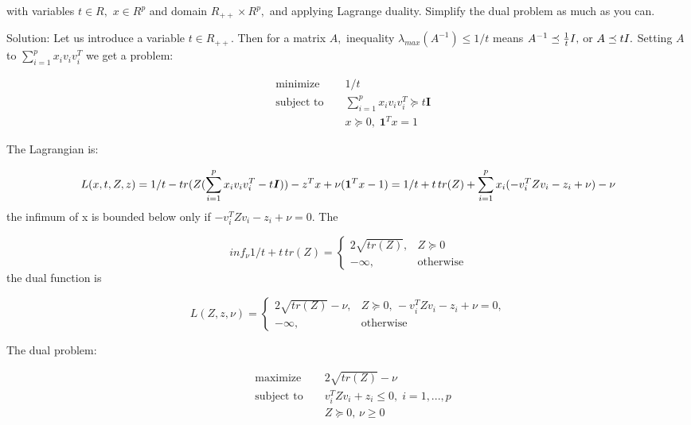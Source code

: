 \documentclass{article}
\begin{document}
with variables $t \in R,$ $x \in R^p$ and domain 
$R_{++} \times R^p,$ and applying Lagrange duality. Simplify the dual problem as much as you can.

Solution:
Let us introduce a variable $t  \in R_{++}.$ Then for a matrix $A,$ inequality 
$\lambda_{max}(A^{-1})  \leq 1 / t$ means $A^{-1} \preceq \frac{1}{t}\boldmath{I},$ or 
$A \preceq t \boldmath{I}.$ Setting $A$ to 
$\sum_{i = 1}^p x_i v_i v_i^T$ we get a problem:

\begin{align*}
&\text{minimize } && 1 / t \\
&\text{subject to } 
&& \sum_{i = 1}^p x_i v_i v_i^T
\succeq t \boldsymbol{I} \\
& &&x \succeq 0, \; \boldsymbol{1}^T x = 1
\end{align*} 





The Lagrangian is: 

$$
L(x, t, Z, z) = 1 / t - 
tr(Z (\sum_{i = 1}^p x_i v_i v_i^T - t \boldsymbol{I})) - z^T x + 
\nu (\boldsymbol{1}^T x - 1) \\ 
= 1 / t + t \, tr(Z) + 
\sum_{i = 1}^p x_i 
(-v_i^T Z v_i - z_i + \nu) - \nu
$$
the infimum of x is bounded below only if 
$-v_i^T Z v_i - z_i + \nu = 0.$ The 

$$
inf_\nu 1/t  + t \, tr(Z) = 
\begin{cases}
2 \sqrt{tr(Z)}, & Z \succeq 0 \\
- \infty, & \text{otherwise}
\end{cases}
$$
the dual function is 

$$
L(Z, z, \nu) = 
\begin{cases}
2 \sqrt{tr(Z)} - \nu, & Z \succeq 0, \,  
-v_i^T Z v_i - z_i + \nu = 0,\\
- \infty, & \text{otherwise}
\end{cases}
$$

The dual problem:

\begin{align*}
&\text{maximize } && 2\sqrt{tr(Z)} - \nu \\
&\text{subject to } 
&& v_i^T Z v_i + z_i \leq 0, 
\; i = 1, ..., p  \\
& &&Z \succeq 0, \, \nu \geq 0\\
\end{align*} 
\end{document}
